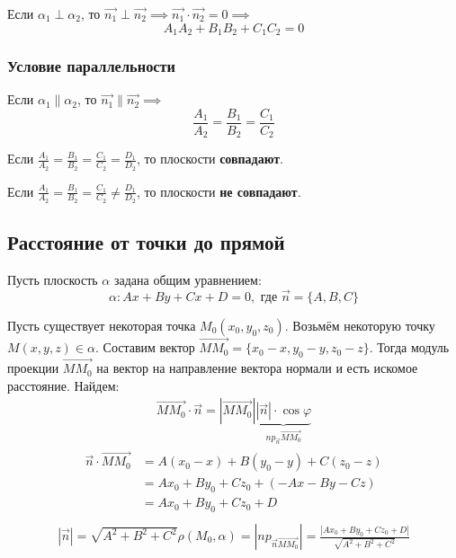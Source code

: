Если $\alpha_1 \perp \alpha_2$, то $\vec{n_1} \perp \vec{n_2} \implies \vec{n_1} \cdot \vec{n_2} = 0 \implies$ \[
  \boxed{A_1 A_2 + B_1 B_2 + C_1 C_2 = 0}
\]

\subsubsection{Условие параллельности}

Если $\alpha_1 \parallel \alpha_2$, то $\vec{n_1} \parallel \vec{n_2} \implies$ \[
  \boxed{\frac{A_1}{A_2} = \frac{B_1}{B_2} = \frac{C_1}{C_2}}
\]

\begin{note}
  Если $\frac{A_1}{A_2} = \frac{B_1}{B_2} = \frac{C_1}{C_2} = \frac{D_1}{D_2}$, то плоскости \textbf{совпадают}.
\end{note}
\begin{note}
  Если $\frac{A_1}{A_2} = \frac{B_1}{B_2} = \frac{C_1}{C_2} \neq \frac{D_1}{D_2}$, то плоскости \textbf{не совпадают}.
\end{note}

\subsection{Расстояние от точки до прямой}

Пусть плоскость $\alpha$ задана общим уравнением: \[
    \alpha: Ax + By + Cx + D = 0, \text{ где } \vec{n} = \{A, B, C\} 
\] 

Пусть существует некоторая точка $M_0(x_0, y_0, z_0)$. Возьмём некоторую точку $M(x, y, z) \in \alpha$. Составим вектор $\overrightarrow{MM_0} = \{x_0 - x, y_0 - y, z_0 - z\}$. Тогда модуль проекции $\overrightarrow{MM_0}$ на вектор на направление вектора нормали и есть искомое расстояние. 
Найдем: 
\begin{gather*}
  \overrightarrow{MM_0} \cdot \vec{n} = |\overrightarrow{MM_0}|\underbrace
  {|\vec{n}| \cdot \cos \varphi}_
  {np_{\vec{n}}\overrightarrow{MM_0}}
\end{gather*}
\begin{align*}
  \vec{n} \cdot \overrightarrow{MM_0} &= A(x_0 - x) + B(y_0 - y) + C(z_0 - z) \\
                                 &= Ax_0 + By_0 + Cz_0 + (-Ax - By - Cz) \\
                                 &= Ax_0 + By_0 + Cz_0  + D \\
\end{align*}
\begin{gather*}
  |\vec{n}| = \sqrt{A^2 + B^2 + C^2}
  \boxed{\rho(M_0, \alpha) = |np_{\vec{n}\overrightarrow{MM_0}}| = \frac{|Ax_0 + By_0 + Cz_0 + D| }{\sqrt{A^2 + B^2 + C^2} } }
\end{gather*}   

